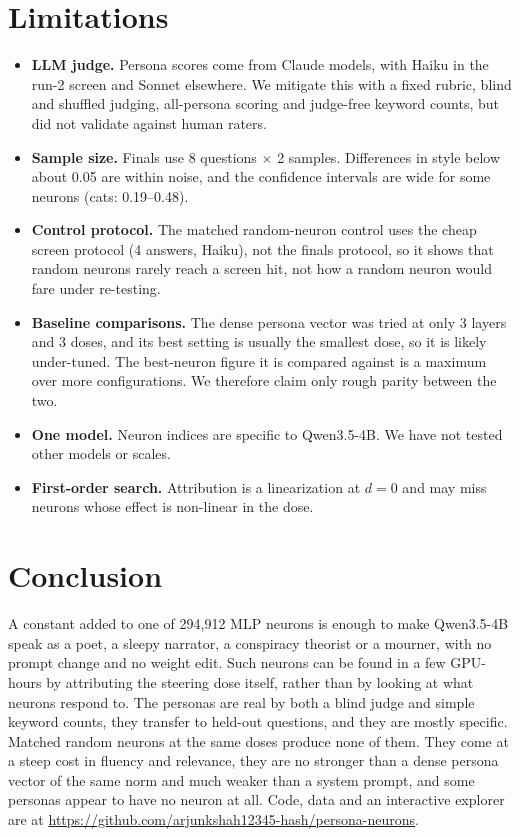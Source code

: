 \documentclass[11pt]{article}
\newcommand{\dose}{d}
\begin{document}
\section{Limitations}

\begin{itemize}[leftmargin=*]
\item \textbf{LLM judge.} Persona scores come from Claude models, with Haiku in the run-2 screen and Sonnet elsewhere. We mitigate this with a fixed rubric, blind and shuffled judging, all-persona scoring and judge-free keyword counts, but did not validate against human raters.
\item \textbf{Sample size.} Finals use 8 questions $\times$ 2 samples. Differences in style below about 0.05 are within noise, and the confidence intervals are wide for some neurons (cats: 0.19--0.48).
\item \textbf{Control protocol.} The matched random-neuron control uses the cheap screen protocol (4 answers, Haiku), not the finals protocol, so it shows that random neurons rarely reach a screen hit, not how a random neuron would fare under re-testing.
\item \textbf{Baseline comparisons.} The dense persona vector was tried at only 3 layers and 3 doses, and its best setting is usually the smallest dose, so it is likely under-tuned. The best-neuron figure it is compared against is a maximum over more configurations. We therefore claim only rough parity between the two.
\item \textbf{One model.} Neuron indices are specific to Qwen3.5-4B. We have not tested other models or scales.
\item \textbf{First-order search.} Attribution is a linearization at $\dose=0$ and may miss neurons whose effect is non-linear in the dose.
\end{itemize}

\section{Conclusion}

A constant added to one of 294,912 MLP neurons is enough to make Qwen3.5-4B speak as a poet, a sleepy narrator, a conspiracy theorist or a mourner, with no prompt change and no weight edit. Such neurons can be found in a few GPU-hours by attributing the steering dose itself, rather than by looking at what neurons respond to. The personas are real by both a blind judge and simple keyword counts, they transfer to held-out questions, and they are mostly specific. Matched random neurons at the same doses produce none of them. They come at a steep cost in fluency and relevance, they are no stronger than a dense persona vector of the same norm and much weaker than a system prompt, and some personas appear to have no neuron at all. Code, data and an interactive explorer are at \url{https://github.com/arjunkshah12345-hash/persona-neurons}.
\end{document}
